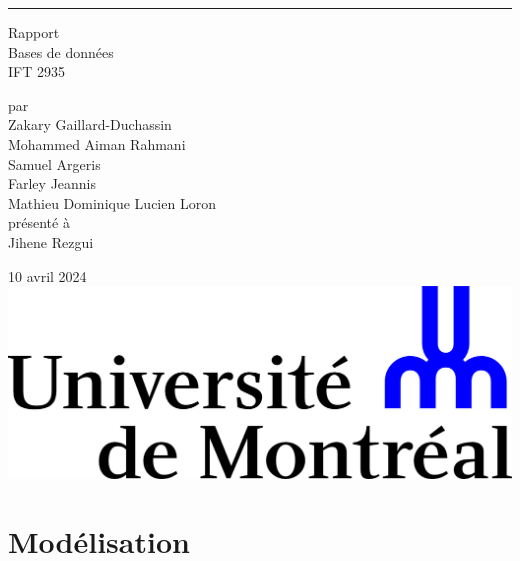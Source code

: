 \documentclass{article}
\begin{document}
\begin{titlepage}
  \centering
  
  \rule{\textwidth}{0px}
  \vspace{15mm}
  
  \Huge{Rapport} \\
  \vspace{5mm}
  \Large Bases de données \\
  IFT 2935
  
  \vspace{40mm}
  \large par \\ \vspace{3mm}
  Zakary Gaillard-Duchassin\\ \vspace{3mm}
  Mohammed Aiman Rahmani \\ \vspace{3mm}
  Samuel Argeris \\ \vspace{3mm}
  Farley Jeannis \\ \vspace{3mm}
  Mathieu Dominique Lucien Loron \\ \vspace{3mm}
  \vspace{30mm}
  présenté à \\ \vspace{3mm}
  Jihene Rezgui
  
  \vfill
  10 avril 2024 \\ \vspace{3mm}
  \includegraphics[scale=0.55]{logo-udem.png}
\end{titlepage}
\newpage

\section{Modélisation}
\end{document}
